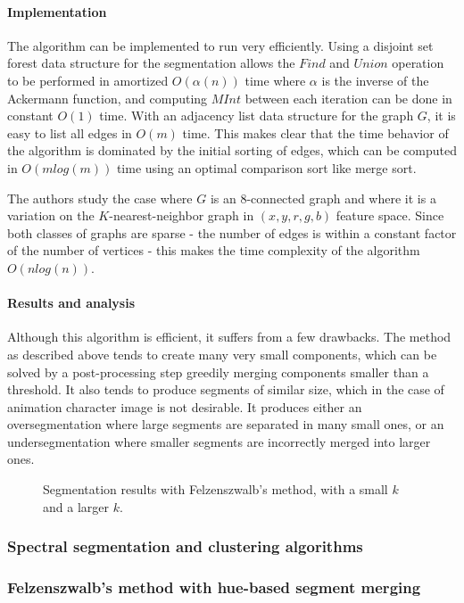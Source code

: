 \paragraph{Implementation} The algorithm can be implemented to run very efficiently. Using a disjoint set forest data structure for the segmentation allows the $Find$ and $Union$ operation to be performed in amortized $O(\alpha(n))$ time where $\alpha$ is the inverse of the Ackermann function, and computing $MInt$ between each iteration can be done in constant $O(1)$ time. With an adjacency list data structure for the graph $G$, it is easy to list all edges in $O(m)$ time. This makes clear that the time behavior of the algorithm is dominated by the initial sorting of edges, which can be computed in $O(mlog(m))$ time using an optimal comparison sort like merge sort.

The authors study the case where $G$ is an $8$-connected graph and where it is a variation on the $K$-nearest-neighbor graph\footnotemark
{}
 in $(x, y, r, g, b)$ feature space. Since both classes of graphs are sparse - the number of edges is within a constant factor of the number of vertices - this makes the time complexity of the algorithm $O(nlog(n))$.


\paragraph{Results and analysis} Although this algorithm is efficient, it suffers from a few drawbacks. The method as described above tends to create many very small components, which can be solved by a post-processing step greedily merging components smaller than a threshold. It also tends to produce segments of similar size, which in the case of animation character image is not desirable. It produces either an oversegmentation where large segments are separated in many small ones, or an undersegmentation where smaller segments are incorrectly merged into larger ones.

\begin{figure}[htb!]
\caption{Segmentation results with Felzenszwalb's method, with a small $k$ and a larger $k$.}
\label{fig:felzenszwalbSegmentationResults}
\end{figure}

\subsubsection{Spectral segmentation and clustering algorithms}

\subsubsection{Felzenszwalb's method with hue-based segment merging}
